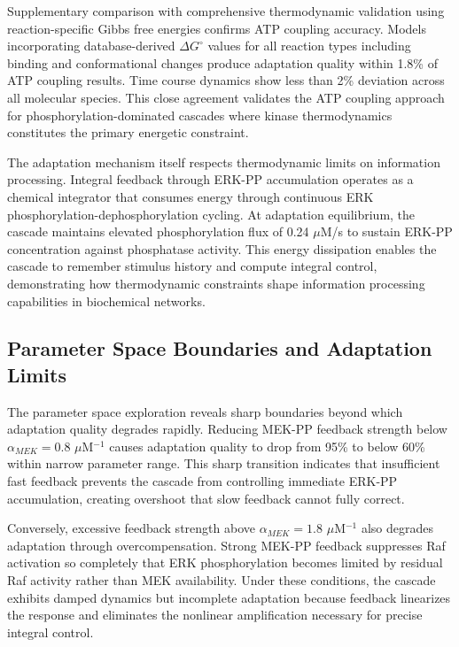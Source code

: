 \documentclass[twocolumn,11pt]{article}
\begin{document}
Supplementary comparison with comprehensive thermodynamic validation using reaction-specific Gibbs free energies confirms ATP coupling accuracy. Models incorporating database-derived $\Delta G^\circ$ values for all reaction types including binding and conformational changes produce adaptation quality within 1.8\% of ATP coupling results. Time course dynamics show less than 2\% deviation across all molecular species. This close agreement validates the ATP coupling approach for phosphorylation-dominated cascades where kinase thermodynamics constitutes the primary energetic constraint.

The adaptation mechanism itself respects thermodynamic limits on information processing. Integral feedback through ERK-PP accumulation operates as a chemical integrator that consumes energy through continuous ERK phosphorylation-dephosphorylation cycling. At adaptation equilibrium, the cascade maintains elevated phosphorylation flux of 0.24 $\mu$M/s to sustain ERK-PP concentration against phosphatase activity. This energy dissipation enables the cascade to remember stimulus history and compute integral control, demonstrating how thermodynamic constraints shape information processing capabilities in biochemical networks.

\subsection{Parameter Space Boundaries and Adaptation Limits}

The parameter space exploration reveals sharp boundaries beyond which adaptation quality degrades rapidly. Reducing MEK-PP feedback strength below $\alpha_{MEK} = 0.8$ $\mu$M$^{-1}$ causes adaptation quality to drop from 95\% to below 60\% within narrow parameter range. This sharp transition indicates that insufficient fast feedback prevents the cascade from controlling immediate ERK-PP accumulation, creating overshoot that slow feedback cannot fully correct.

Conversely, excessive feedback strength above $\alpha_{MEK} = 1.8$ $\mu$M$^{-1}$ also degrades adaptation through overcompensation. Strong MEK-PP feedback suppresses Raf activation so completely that ERK phosphorylation becomes limited by residual Raf activity rather than MEK availability. Under these conditions, the cascade exhibits damped dynamics but incomplete adaptation because feedback linearizes the response and eliminates the nonlinear amplification necessary for precise integral control.
\end{document}

